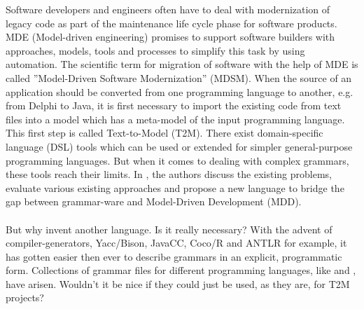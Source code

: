 
Software developers and engineers often have to deal with 
modernization of legacy code
as part of the maintenance 
life cycle phase for software products. 
MDE (Model-driven engineering) promises to support software
builders with approaches, models, tools and processes to 
simplify this task by using automation.
The scientific term for
migration of software with the help of MDE 
is called 
''Model-Driven Software
Modernization'' (MDSM)\cite{Kowalczyk2009model}.
When the source of an application should be converted from 
one programming language to another, e.g. from Delphi to Java,
it is first necessary to import the existing code from text files
into a model which has a meta-model of the input 
programming language.
This first step is called Text-to-Model (T2M).
There exist domain-specific language (DSL) tools
which can be used or extended for simpler general-purpose
programming languages.
But when it comes to dealing with complex grammars, these tools
reach their limits. 
In \cite{Izquierdo2014extracting},
the authors discuss the existing problems, evaluate various existing
approaches and propose a new language to bridge the gap between
grammar-ware and Model-Driven Development (MDD).
\\ \ \\
But why invent another language. 
Is it really necessary?
With the advent of compiler-generators,
Yacc/Bison\cite{Bison},
JavaCC, 
Coco/R\cite{COCOR} and 
ANTLR\cite{Antlr}
for example,
it has gotten easier then ever to describe 
grammars in an explicit, programmatic form.
Collections of grammar files for different
programming languages, like \cite{Grammarzoo} and 
\cite{grammars_v4}, have arisen.
Wouldn't it be nice if they could just be used,
as they are, for
T2M projects?

